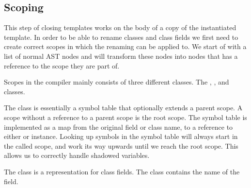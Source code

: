 %
%

\subsection{Scoping}\label{subsec:inst-scoping}

This step of closing templates works on the body of a copy of the instantiated template.
In order to be able to rename classes and class fields we first need to create correct scopes in which the renaming can be applied to.
We start of with a list of normal AST nodes and will transform these nodes into nodes that has a reference to the scope they are part of.

Scopes in the compiler mainly consists of three different classes.
The , , and  classes.

The  class is essentially a symbol table that optionally extends a parent scope.
A scope without a reference to a parent scope is the root scope.
The symbol table is implemented as a map from the original field or class name, to a reference to either  or  instance.
Looking up symbols in the symbol table will always start in the called scope, and work its way upwards until we reach the root scope.
This allows us to correctly handle shadowed variables.

The  class is a representation for class fields.
The class contains the name of the field.


